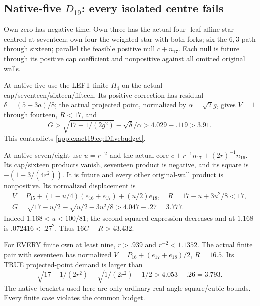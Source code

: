 \documentclass[11pt]{article}
\theoremstyle{definition}
\theoremstyle{remark}
\begin{document}
\subsection[Native-five D19: every isolated centre fails]{Native-five \(D_{19}\): every isolated centre fails}
\label{app:exact19:Dfiveisolatedcentre}

Own zero has negative time.
Own three has the actual four-
leaf affine star centred at
seventeen; own four the weighted
star with both forks; six the
\(6,3\) path through sixteen;
parallel the feasible positive
null \(c+n_{17}\).
Each null is future through its
positive cap coefficient and
nonpositive against all omitted
original walls.

At native five use the LEFT
finite \(H_4\) on the actual
cap/seventeen/sixteen/fifteen.
Its positive correction has
residual \(\delta=(5-3a)/8\);
the actual projected point,
normalized by \(\alpha=\sqrt2g\),
gives \(V=1\) through fourteen,
\(R<17\), and
\[
 G>\sqrt{17-1/(2g^2)}-\sqrt\delta/\alpha
                                      >4.029-.119>3.91 .
\]
This contradicts
\eqref{app:exact19:eq:Dfivebudget}.

At native seven/eight use
\(u=r^{-2}\) and the actual core
\(c+r^{-1}n_{17}+(2r)^{-1}n_{16}\).
Its cap/sixteen products vanish,
seventeen product is negative,
and its square is
\(-(1-3/(4r^2))\).
It is future and every other
original-wall product is
nonpositive.
Its normalized displacement is
\[
 \begin{gathered}
 V=P_{15}+(1-u/4)(e_{16}+e_{17})+(u/2)e_{18},
                 \quad R=17-u+3u^2/8<17,\\
 G=\sqrt{17-u/2}-\sqrt{u/2-3u^2/8}>4.047-.27=3.777 .
 \end{gathered}
\]
Indeed \(1.168<u<100/81\);
the second squared expression
decreases and at \(1.168\) is
\(.072416<.27^2\).
Thus \(16G-R>43.432\).

For EVERY finite own at least
nine, \(r>.939\) and
\(r^{-2}<1.1352\).
The actual finite pair with
seventeen has normalized
\(V=P_{16}+(e_{17}+e_{18})/2\),
\(R=16.5\).
Its TRUE projected-point demand
is larger than
\[
 \sqrt{17-1/(2r^2)}-\sqrt{1/(2r^2)-1/2}
                                      >4.053-.26=3.793 .
\]
The native brackets used here
are only ordinary real-angle
square/cubic bounds.
Every finite case violates the
common budget.
\end{document}
